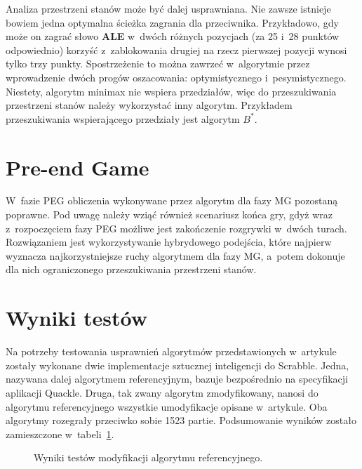 \documentclass[a4paper,twocolumn,12pt]{article}
\theoremstyle{definition}
\begin{document}
Analiza przestrzeni stanów może być dalej usprawniana. Nie zawsze istnieje bowiem jedna optymalna ścieżka zagrania dla przeciwnika. Przykładowo, gdy może on zagrać słowo \textbf{ALE} w~dwóch różnych pozycjach (za 25 i~28 punktów odpowiednio) korzyść z~zablokowania drugiej na rzecz pierwszej pozycji wynosi tylko trzy punkty. Spostrzeżenie to można zawrzeć w~algorytmie przez wprowadzenie dwóch progów oszacowania: optymistycznego i~pesymistycznego. Niestety, algorytm minimax nie wspiera przedziałów, więc do przeszukiwania przestrzeni stanów należy wykorzystać inny algorytm. Przykładem przeszukiwania wspierającego przedziały jest algorytm $B^{*}$. \cite{bstar}

\section*{Pre-end Game}

W~fazie PEG obliczenia wykonywane przez algorytm dla fazy MG pozostaną poprawne. Pod uwagę należy wziąć również scenariusz końca gry, gdyż wraz z~rozpoczęciem fazy PEG możliwe jest zakończenie rozgrywki w~dwóch turach. Rozwiązaniem jest wykorzystywanie hybrydowego podejścia, które najpierw wyznacza najkorzystniejsze ruchy algorytmem dla fazy MG, a~potem dokonuje dla nich ograniczonego przeszukiwania przestrzeni stanów.

\section*{Wyniki testów}

Na potrzeby testowania usprawnień algorytmów przedstawionych w~artykule zostały wykonane dwie implementacje sztucznej inteligencji do Scrabble. Jedna, nazywana dalej algorytmem referencyjnym, bazuje bezpośrednio na specyfikacji aplikacji Quackle. \cite{quackle_algorithm} Druga, tak zwany algorytm zmodyfikowany, nanosi do algorytmu referencyjnego wszystkie umodyfikacje opisane w~artykule. Oba algorytmy rozegrały przeciwko sobie 1523 partie. Podsumowanie wyników zostało zamieszczone w~tabeli~\ref{tab:test_results}.

\begin{figure}[ht!]
	\centering
	\caption{Wyniki testów modyfikacji algorytmu referencyjnego.}
	\label{tab:test_results}
\end{figure}
\end{document}
